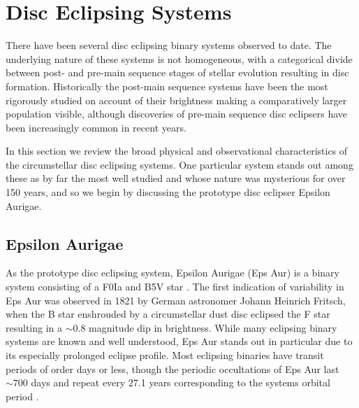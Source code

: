 \documentclass[%
 reprint,
 amsmath,amssymb,
 aps,
rmp,
floatfix,
]{revtex4-2}
\begin{document}
\section{Disc Eclipsing Systems} \label{sec:disc-eclipse}
There have been several disc eclipsing binary systems observed to date. The underlying nature of these systems is not homogeneous, with a categorical divide between post- and pre-main sequence stages of stellar evolution resulting in disc formation. Historically the post-main sequence systems have been the most rigorously studied on account of their brightness making a comparatively larger population visible, although discoveries of pre-main sequence disc eclipsers have been increasingly common in recent years.  

In this section we review the broad physical and observational characteristics of the circumstellar disc eclipsing systems. One particular system stands out among these as by far the most well studied and whose nature was mysterious for over 150 years, and so we begin by discussing the prototype disc eclipser Epsilon Aurigae.


\subsection{Epsilon Aurigae} \label{sec:eps-aur}

As the prototype disc eclipsing system, Epsilon Aurigae (Eps Aur) is a binary system consisting of a F0Ia and B5V star \citep{Hoard2010ApJ}. The first indication of variability in Eps Aur was observed in 1821 by German astronomer Johann Heinrich Fritsch, when the B star enshrouded by a circumstellar dust disc eclipsed the F star resulting in a $\sim 0.8$ magnitude dip in brightness.  
While many eclipsing binary systems are known and well understood, Eps Aur stands out in particular due to its especially prolonged eclipse profile. Most eclipsing binaries have transit periods of order days or less, though the periodic occultations of Eps Aur last $\sim 700$ days and repeat every 27.1 years corresponding to the systems orbital period \citep{Stencel2011AJ}.
\end{document}
